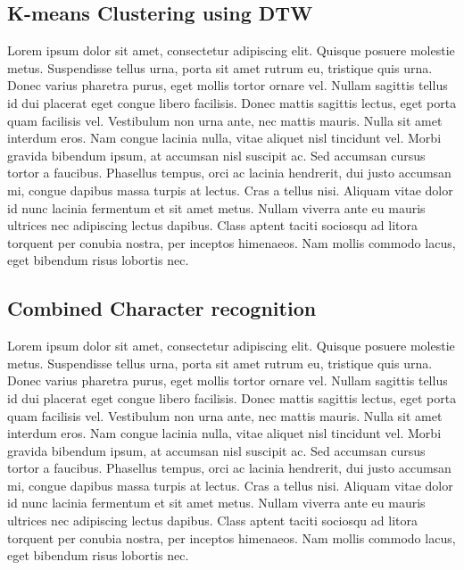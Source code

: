 \documentclass[12pt]{article}
\begin{document}
	\subsection{K-means Clustering using DTW}
	Lorem ipsum dolor sit amet, consectetur adipiscing elit. Quisque posuere molestie metus. Suspendisse tellus urna, porta sit amet rutrum eu, tristique quis urna. Donec varius pharetra purus, eget mollis tortor ornare vel. Nullam sagittis tellus id dui placerat eget congue libero facilisis. Donec mattis sagittis lectus, eget porta quam facilisis vel. Vestibulum non urna ante, nec mattis mauris. Nulla sit amet interdum eros. Nam congue lacinia nulla, vitae aliquet nisl tincidunt vel. Morbi gravida bibendum ipsum, at accumsan nisl suscipit ac. Sed accumsan cursus tortor a faucibus. Phasellus tempus, orci ac lacinia hendrerit, dui justo accumsan mi, congue dapibus massa turpis at lectus. Cras a tellus nisi. Aliquam vitae dolor id nunc lacinia fermentum et sit amet metus. Nullam viverra ante eu mauris ultrices nec adipiscing lectus dapibus. Class aptent taciti sociosqu ad litora torquent per conubia nostra, per inceptos himenaeos. Nam mollis commodo lacus, eget bibendum risus lobortis nec.
	
	\subsection{Combined Character recognition}
	Lorem ipsum dolor sit amet, consectetur adipiscing elit. Quisque posuere molestie metus. Suspendisse tellus urna, porta sit amet rutrum eu, tristique quis urna. Donec varius pharetra purus, eget mollis tortor ornare vel. Nullam sagittis tellus id dui placerat eget congue libero facilisis. Donec mattis sagittis lectus, eget porta quam facilisis vel. Vestibulum non urna ante, nec mattis mauris. Nulla sit amet interdum eros. Nam congue lacinia nulla, vitae aliquet nisl tincidunt vel. Morbi gravida bibendum ipsum, at accumsan nisl suscipit ac. Sed accumsan cursus tortor a faucibus. Phasellus tempus, orci ac lacinia hendrerit, dui justo accumsan mi, congue dapibus massa turpis at lectus. Cras a tellus nisi. Aliquam vitae dolor id nunc lacinia fermentum et sit amet metus. Nullam viverra ante eu mauris ultrices nec adipiscing lectus dapibus. Class aptent taciti sociosqu ad litora torquent per conubia nostra, per inceptos himenaeos. Nam mollis commodo lacus, eget bibendum risus lobortis nec.
	
\end{document}

